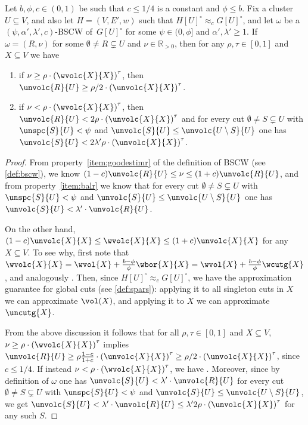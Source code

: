 \begin{lemma}
	\label{lem:algovols}
	Let $b, \phi, c \in (0,1)$ be such that $c \leq 1/4$ is a constant and $\phi \le b$. Fix a cluster $U \subseteq V$, and also let $H=(V,E',w)$ such that $H[U]^\circ \approx_c G[U]^\circ$, and let $\omega$ be a  $(\psi,\alpha',\lambda', c)$-BSCW of~$G[U]^\circ$ for some $\psi \in (0,\phi]$ and $\alpha',\lambda' \ge 1$. If $\omega = (R,\nu)$ for some $\emptyset \neq R \subsetneq U$ and $\nu \in \mathbb{R}_{>0}$, then for any $\rho,\tau \in [0,1]$ and $X \subseteq V$ we have
	\begin{enumerate}
		\item if $\nu \ge \rho \cdot \left(\wvolc{X}{X}\right)^\tau$, then $\unvolc{R}{U} \ge \rho/2 \cdot \left(\unvolc{X}{X}\right)^\tau$.
		\item if $\nu < \rho \cdot \left(\wvolc{X}{X}\right)^\tau$, then $\unvolc{R}{U} < 2\rho \cdot \left(\unvolc{X}{X}\right)^\tau$ and for every cut $\emptyset \neq  S \subsetneq U$ with $\unspc{S}{U} < \psi$ and $ \unvolc{S}{U} \le \unvolc{U \setminus S}{U}$ one has $\unvolc{S}{U} < 2\lambda' \rho \cdot \left(\unvolc{X}{X}\right)^\tau $.
	\end{enumerate}
\end{lemma}
\begin{proof}
	From property~\eqref{item:goodestimr} of the definition of BSCW (see \cref{def:bscw}), we know $(1-c)\unvolc{R}{U} \le \nu \le (1+c)\unvolc{R}{U} $, and from property~\eqref{item:balr} we know  that for every cut $\emptyset \neq  S \subsetneq U$ with $\unspc{S}{U} < \psi$ and $ \unvolc{S}{U} \le \unvolc{U \setminus S}{U}$ one has $\unvolc{S}{U} < \lambda'  \cdot \unvolc{R}{U}$.
	
	On the other hand, $(1-c)\unvolc{X}{X} \le \wvolc{X}{X} \le (1+c)\unvolc{X}{X}$ for any $X \subseteq V$. To see why, first note that $\wvolc{X}{X}=\wvol{X}+\frac{b-\phi}{\phi}\wbor{X}{X}=\wvol{X}+\frac{b-\phi}{\phi}\wcutg{X}$, and analogously . Then, since $H[U]^\circ \approx_c G[U]^\circ$, we have the approximation guarantee for global cuts (see \cref{def:spars}): applying it to all singleton cuts in $X$ we can approximate $\vol(X)$, and applying it to $X$ we can approximate $\uncutg{X}$.
	
	From the above discussion it follows that for all $\rho,\tau \in [0,1]$ and $X \subseteq V$, $\nu \ge \rho \cdot \left(\wvolc{X}{X}\right)^\tau$ implies $\unvolc{R}{U} \ge \rho \frac{1-c}{1+c} \cdot \left(\unvolc{X}{X}\right)^\tau \ge \rho/2 \cdot \left(\unvolc{X}{X}\right)^\tau$, since $c \le 1/4$.  If instead $\nu < \rho \cdot \left(\wvolc{X}{X}\right)^\tau$, we have . Moreover, since by definition of $\omega$ one has $\unvolc{S}{U} < \lambda'  \cdot \unvolc{R}{U}$  for every cut $\emptyset \neq  S \subsetneq U$ with $\unspc{S}{U} < \psi$ and $ \unvolc{S}{U} \le \unvolc{U \setminus S}{U}$, we get $\unvolc{S}{U} < \lambda'  \cdot \unvolc{R}{U} \le \lambda' 2\rho \cdot \left(\unvolc{X}{X}\right)^\tau$ for any such $S$.
\end{proof}


